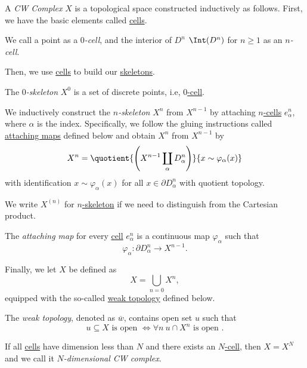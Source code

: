 \begin{definition}[CW Complex]\label{def:CW-Complex}
	A \emph{CW Complex} \(X\) is a topological space constructed inductively as follows. First, we have the basic elements called \hyperref[def:cell]{cells}.

	\begin{definition}[Cell]\label{def:cell}
		We call a point as a \emph{\(0\)-cell}, and the interior of \(D^n\) \(\Int (D^n)\) for \(n\geq 1\) as an \emph{\(n\)-cell}.
	\end{definition}
	Then, we use \hyperref[def:cell]{cells} to build our \hyperref[def:skeleton]{skeletons}.

	\begin{definition}[Skeleton]\label{def:skeleton}
		\item The \emph{\(0\)-skeleton} \(X^0\) is a set of discrete points, i.e, \hyperref[def:cell]{\(0\)-cell}.
		\item We inductively construct the \emph{\(n\)-skeleton} \(X^n\) from \(X^{n-1}\) by attaching \hyperref[def:cell]{\(n\)-cells} \(e^n_{\alpha}\), where \(\alpha\) is the index. Specifically, we follow the gluing instructions called \hyperref[def:attaching-map]{attaching maps} defined below and obtain \(X^n\) from \(X^{n-1}\) by
		\[
			X^n = \quotient{\left(X^{n-1}\coprod\limits_{\alpha}D^n_\alpha\right)}{x\sim \varphi_{\alpha}(x)}
		\]
		with identification \(x\sim \varphi_{\alpha}(x)\) for all \(x\in \partial D^n_{\alpha}\) with quotient topology.
		\begin{remark}
			We write \(X^{(n)}\) for \hyperref[def:skeleton]{\(n\)-skeleton} if we need to distinguish from the Cartesian product.
		\end{remark}
	\end{definition}

	\begin{definition}\label{def:attaching-map}
		The \emph{attaching map} for every \hyperref[def:cell]{cell} \(e^n_\alpha \) is a continuous map \(\varphi_{\alpha}\) such that
		\[
			\varphi_{\alpha}\colon \partial D^n_{\alpha}\to X^{n-1}.
		\]
	\end{definition}

	Finally, we let \(X\) be defined as
	\[
		X = \bigcup\limits_{n=0} X^n,
	\]
	equipped with the so-called \hyperref[def:weak-topology]{weak topology} defined below.

	\begin{definition}\label{def:weak-topology}
		The \emph{weak topology}, denoted as \(\overline{w} \), contains open set \(u\) such that
		\[
			u\subseteq X \text{ is open }\iff \forall n\ u\cap X^n \text{ is open }.
		\]
	\end{definition}

	If all \hyperref[def:cell]{cells} have dimension less than \(N\) and there exists an \hyperref[def:cell]{\(N\)-cell}, then \(X = X^N\) and we call it \emph{\(N\)-dimensional CW complex}.
\end{definition}

